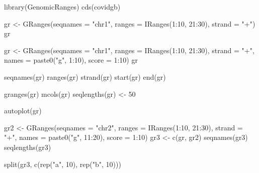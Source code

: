 \documentclass[
]{book}
\newenvironment{Shaded}{\begin{snugshade}}{\end{snugshade}}
\newcommand{\AttributeTok}[1]{\textcolor[rgb]{0.77,0.63,0.00}{#1}}
\newcommand{\DecValTok}[1]{\textcolor[rgb]{0.00,0.00,0.81}{#1}}
\newcommand{\FunctionTok}[1]{\textcolor[rgb]{0.00,0.00,0.00}{#1}}
\newcommand{\NormalTok}[1]{#1}
\newcommand{\OtherTok}[1]{\textcolor[rgb]{0.56,0.35,0.01}{#1}}
\newcommand{\SpecialCharTok}[1]{\textcolor[rgb]{0.00,0.00,0.00}{#1}}
\newcommand{\StringTok}[1]{\textcolor[rgb]{0.31,0.60,0.02}{#1}}
\begin{document}
\begin{Shaded}
\begin{Highlighting}[]
\FunctionTok{library}\NormalTok{(GenomicRanges)}
\FunctionTok{cds}\NormalTok{(covidgb)}

\NormalTok{gr }\OtherTok{\textless{}{-}} \FunctionTok{GRanges}\NormalTok{(}\AttributeTok{seqnames =} \StringTok{"chr1"}\NormalTok{, }
              \AttributeTok{ranges =} \FunctionTok{IRanges}\NormalTok{(}\DecValTok{1}\SpecialCharTok{:}\DecValTok{10}\NormalTok{, }\DecValTok{21}\SpecialCharTok{:}\DecValTok{30}\NormalTok{),}
              \AttributeTok{strand =} \StringTok{"+"}\NormalTok{)}
\NormalTok{gr}


\NormalTok{gr }\OtherTok{\textless{}{-}} \FunctionTok{GRanges}\NormalTok{(}\AttributeTok{seqnames =} \StringTok{"chr1"}\NormalTok{, }
              \AttributeTok{ranges =} \FunctionTok{IRanges}\NormalTok{(}\DecValTok{1}\SpecialCharTok{:}\DecValTok{10}\NormalTok{, }\DecValTok{21}\SpecialCharTok{:}\DecValTok{30}\NormalTok{),}
              \AttributeTok{strand =} \StringTok{"+"}\NormalTok{, }
              \AttributeTok{names =} \FunctionTok{paste0}\NormalTok{(}\StringTok{"g"}\NormalTok{, }\DecValTok{1}\SpecialCharTok{:}\DecValTok{10}\NormalTok{), }
              \AttributeTok{score =} \DecValTok{1}\SpecialCharTok{:}\DecValTok{10}\NormalTok{)}
\NormalTok{gr}

\FunctionTok{seqnames}\NormalTok{(gr)}
\FunctionTok{ranges}\NormalTok{(gr)}
\FunctionTok{strand}\NormalTok{(gr)}
\FunctionTok{start}\NormalTok{(gr)}
\FunctionTok{end}\NormalTok{(gr)}

\FunctionTok{granges}\NormalTok{(gr) }
\FunctionTok{mcols}\NormalTok{(gr)}
\FunctionTok{seqlengths}\NormalTok{(gr) }\OtherTok{\textless{}{-}} \DecValTok{50}

\FunctionTok{autoplot}\NormalTok{(gr)}


\NormalTok{gr2 }\OtherTok{\textless{}{-}} \FunctionTok{GRanges}\NormalTok{(}\AttributeTok{seqnames =} \StringTok{"chr2"}\NormalTok{, }
              \AttributeTok{ranges =} \FunctionTok{IRanges}\NormalTok{(}\DecValTok{1}\SpecialCharTok{:}\DecValTok{10}\NormalTok{, }\DecValTok{21}\SpecialCharTok{:}\DecValTok{30}\NormalTok{),}
              \AttributeTok{strand =} \StringTok{"+"}\NormalTok{, }
              \AttributeTok{names =} \FunctionTok{paste0}\NormalTok{(}\StringTok{"g"}\NormalTok{, }\DecValTok{11}\SpecialCharTok{:}\DecValTok{20}\NormalTok{), }
              \AttributeTok{score =} \DecValTok{1}\SpecialCharTok{:}\DecValTok{10}\NormalTok{)}
\NormalTok{gr3 }\OtherTok{\textless{}{-}} \FunctionTok{c}\NormalTok{(gr, gr2)}
\FunctionTok{seqnames}\NormalTok{(gr3)}
\FunctionTok{seqlengths}\NormalTok{(gr3)}

\FunctionTok{split}\NormalTok{(gr3, }\FunctionTok{c}\NormalTok{(}\FunctionTok{rep}\NormalTok{(}\StringTok{"a"}\NormalTok{, }\DecValTok{10}\NormalTok{), }\FunctionTok{rep}\NormalTok{(}\StringTok{"b"}\NormalTok{, }\DecValTok{10}\NormalTok{)))}
\end{Highlighting}
\end{Shaded}
\end{document}
